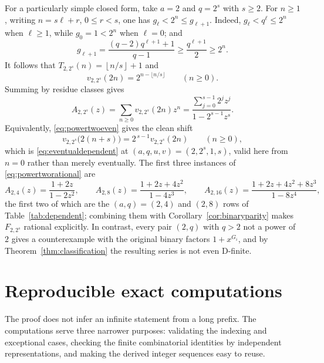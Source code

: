 \documentclass[11pt,letterpaper]{article}
\numberwithin{equation}{section}
\theoremstyle{definition}
\theoremstyle{remark}
\newcommand{\floor}[1]{\left\lfloor#1\right\rfloor}
\begin{document}
For a particularly simple closed form, take $a=2$ and $q=2^s$ with
$s\ge2$. For $n\ge1$, writing $n=s\ell+r$, $0\le r<s$, one has
$g_\ell<2^n\le g_{\ell+1}$. Indeed,
$g_\ell<q^\ell\le2^n$ when $\ell\ge1$, while $g_0=1<2^n$ when
$\ell=0$; and
\[
 g_{\ell+1}=\frac{(q-2)q^{\ell+1}+1}{q-1}
 \ge\frac{q^{\ell+1}}2\ge2^n.
\]
It follows that $T_{2,2^s}(n)=\floor{n/s}+1$ and
\begin{equation}\label{eq:powertwoeven}
 v_{2,2^s}(2n)=2^{n-\lfloor n/s\rfloor}\qquad(n\ge0).
\end{equation}
Summing by residue classes gives
\begin{equation}\label{eq:powertworational}
 A_{2,2^s}(z)=\sum_{n\ge0}v_{2,2^s}(2n)z^n
 =\frac{\sum_{j=0}^{s-1}2^jz^j}{1-2^{s-1}z^s}.
\end{equation}
Equivalently, \eqref{eq:powertwoeven} gives the clean shift
\begin{equation}\label{eq:powerrec}
 v_{2,2^s}\bigl(2(n+s)\bigr)=2^{\,s-1}v_{2,2^s}(2n)\qquad(n\ge0),
\end{equation}
which is \eqref{eq:eventualdependent} at $(a,q,u,v)=(2,2^s,1,s)$, valid
here from $n=0$ rather than merely eventually. The first three instances of
\eqref{eq:powertworational} are
\begin{equation}\label{eq:rationalinstances}
 A_{2,4}(z)=\frac{1+2z}{1-2z^2},\qquad
 A_{2,8}(z)=\frac{1+2z+4z^2}{1-4z^3},\qquad
 A_{2,16}(z)=\frac{1+2z+4z^2+8z^3}{1-8z^4},
\end{equation}
the first two of which are the $(a,q)=(2,4)$ and $(2,8)$ rows of
Table~\ref{tab:dependent}; combining them with
Corollary~\ref{cor:binaryparity} makes $F_{2,2^s}$ rational explicitly. In contrast, every pair $(2,q)$ with $q>2$ not a power
of $2$ gives a counterexample with the original binary factors $1+x^{G_i}$,
and by Theorem~\ref{thm:classification} the resulting series is not even
D-finite.

\section{Reproducible exact computations}\label{sec:computations}

The proof does not infer an infinite statement from a long prefix. The
computations serve three narrower purposes: validating the indexing and
exceptional cases, checking the finite combinatorial identities by
independent representations, and making the derived integer sequences easy
to reuse.
\end{document}
